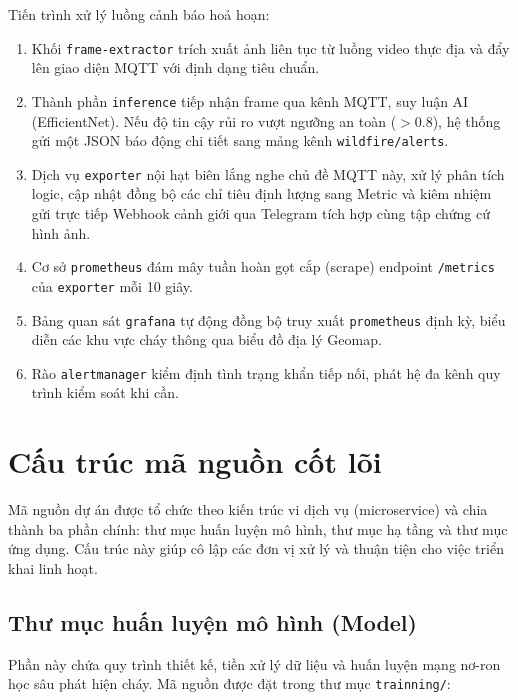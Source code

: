\documentclass[12pt,a4paper]{report}
\begin{document}
Tiến trình xử lý luồng cảnh báo hoả hoạn:
\begin{enumerate}
  \item Khối \texttt{frame-extractor} trích xuất ảnh liên tục từ luồng video thực địa và đẩy lên giao diện MQTT với định dạng tiêu chuẩn.
  \item Thành phần \texttt{inference} tiếp nhận frame qua kênh MQTT, suy luận AI (EfficientNet). Nếu độ tin cậy rủi ro vượt ngưỡng an toàn ($> 0.8$), hệ thống gửi một JSON báo động chi tiết sang mảng kênh \texttt{wildfire/alerts}.
  \item Dịch vụ \texttt{exporter} nội hạt biên lắng nghe chủ đề MQTT này, xử lý phân tích logic, cập nhật đồng bộ các chỉ tiêu định lượng sang Metric và kiêm nhiệm gửi trực tiếp Webhook cảnh giới qua Telegram tích hợp cùng tập chứng cứ hình ảnh.
  \item Cơ sở \texttt{prometheus} đám mây tuần hoàn gọt cắp (scrape) endpoint \texttt{/metrics} của \texttt{exporter} mỗi 10 giây.
  \item Bảng quan sát \texttt{grafana} tự động đồng bộ truy xuất \texttt{prometheus} định kỳ, biểu diễn các khu vực cháy thông qua biểu đồ địa lý Geomap.
  \item Rào \texttt{alertmanager} kiểm định tình trạng khẩn tiếp nối, phát hệ đa kênh quy trình kiểm soát khi cần.
\end{enumerate}

\section{Cấu trúc mã nguồn cốt lõi}

Mã nguồn dự án được tổ chức theo kiến trúc vi dịch vụ (microservice) và chia thành ba phần chính: thư mục huấn luyện mô hình, thư mục hạ tầng và thư mục ứng dụng. Cấu trúc này giúp cô lập các đơn vị xử lý và thuận tiện cho việc triển khai linh hoạt.

\subsection{Thư mục huấn luyện mô hình (Model)}

Phần này chứa quy trình thiết kế, tiền xử lý dữ liệu và huấn luyện mạng nơ-ron học sâu phát hiện cháy. Mã nguồn được đặt trong thư mục \texttt{trainning/}:
\end{document}
